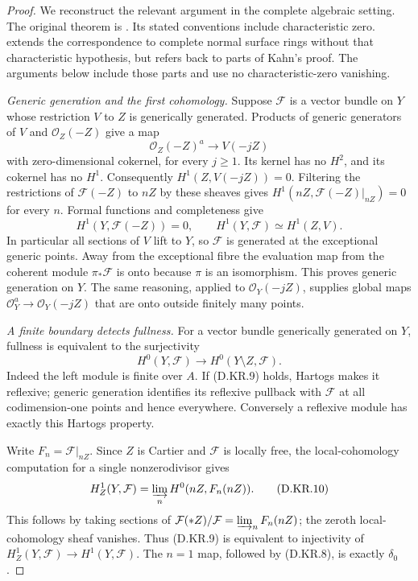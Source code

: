 \begin{proof}
We reconstruct the relevant argument in the complete algebraic
setting. The original theorem is
\citet[Theorem~1.4, Propositions~1.6 and~1.9, Claim on p.~148,
and Corollary~1.10, pp.~143--149]{C_Kahn1989}.
Its stated conventions include characteristic zero.
\citet[Section~2, Theorem~2 and Propositions~3--4,
pp.~69--71]{C_Gavran2012} extends the correspondence to complete
normal surface rings without that characteristic hypothesis,
but refers back to parts of Kahn's proof. The arguments below
include those parts and use no characteristic-zero vanishing.

\emph{Generic generation and the first cohomology.}
Suppose $\mathcal F$ is a vector bundle on $Y$ whose restriction
$V$ to $Z$ is generically generated. Products of generic
generators of $V$ and $\mathcal O_Z(-Z)$ give a map
\[
      \mathcal O_Z(-Z)^a\longrightarrow V(-jZ)
\]
with zero-dimensional cokernel, for every $j\ge1$.
Its kernel has no $H^2$, and its cokernel has no $H^1$.
Consequently $H^1(Z,V(-jZ))=0$. Filtering the restrictions of
$\mathcal F(-Z)$ to $nZ$ by these sheaves gives
$H^1(nZ,\mathcal F(-Z)|_{nZ})=0$ for every $n$.
Formal functions and completeness give
\[
 H^1(Y,\mathcal F(-Z))=0,
 \qquad H^1(Y,\mathcal F)\simeq H^1(Z,V).              \tag{D.KR.8}
\]
In particular all sections of $V$ lift to $Y$, so
$\mathcal F$ is generated at the exceptional generic points.
Away from the exceptional fibre the evaluation map from the
coherent module $\pi_*\mathcal F$ is onto because $\pi$ is an
isomorphism. This proves generic generation on $Y$.
The same reasoning, applied to $\mathcal O_Y(-jZ)$, supplies
global maps $\mathcal O_Y^a\to\mathcal O_Y(-jZ)$ that are
onto outside finitely many points.

\emph{A finite boundary detects fullness.}
For a vector bundle generically generated on $Y$, fullness is
equivalent to the surjectivity
\[
       H^0(Y,\mathcal F)\longrightarrow
       H^0(Y\setminus Z,\mathcal F).                  \tag{D.KR.9}
\]
Indeed the left module is finite over $A$. If (D.KR.9) holds,
Hartogs makes it reflexive; generic generation identifies its
reflexive pullback with $\mathcal F$ at all codimension-one
points and hence everywhere. Conversely a reflexive module
has exactly this Hartogs property.

Write $F_n=\mathcal F|_{nZ}$. Since $Z$ is Cartier and
$\mathcal F$ is locally free, the local-cohomology computation
for a single nonzerodivisor gives
\[
 H^1_Z(Y,\mathcal F)
        =\varinjlim_n H^0(nZ,F_n(nZ)).                 \tag{D.KR.10}
\]
This follows by taking sections of
$\mathcal F(*Z)/\mathcal F
 =\varinjlim_n F_n(nZ)$; the zeroth local-cohomology sheaf
vanishes. Thus (D.KR.9) is equivalent to injectivity of
$H^1_Z(Y,\mathcal F)\to H^1(Y,\mathcal F)$.
The $n=1$ map, followed by (D.KR.8), is exactly $\delta_0$.


\end{proof}
